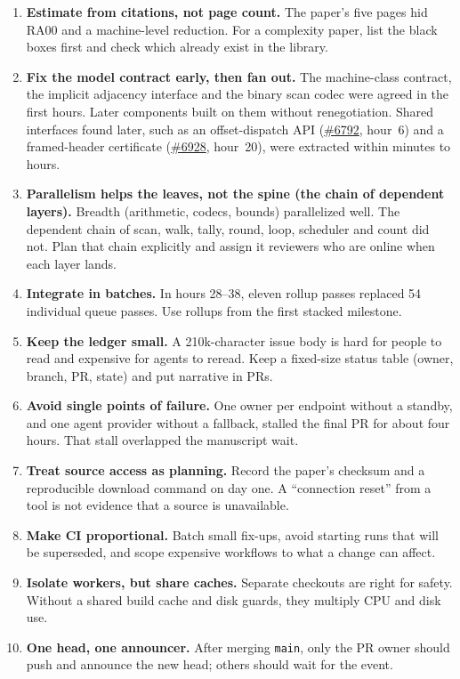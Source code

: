 \documentclass[11pt]{article}
\newcommand{\pr}[1]{\href{https://github.com/cslib-community/cslib-frontier/pull/#1}{\##1}}
\newcommand{\code}[1]{\texttt{\small #1}}
\begin{document}
\begin{enumerate}
\item \textbf{Estimate from citations, not page count.} The paper's five pages hid RA00 and a
machine-level reduction. For a complexity paper, list the black boxes first and check which
already exist in the library.
\item \textbf{Fix the model contract early, then fan out.} The machine-class contract, the implicit
adjacency interface and the binary scan codec were agreed in the first hours. Later components
built on them without renegotiation. Shared interfaces found later, such as an offset-dispatch
API (\pr{6792}, hour~6) and a framed-header certificate (\pr{6928}, hour~20), were extracted
within minutes to hours.
\item \textbf{Parallelism helps the leaves, not the spine (the chain of dependent layers).} Breadth (arithmetic, codecs, bounds)
parallelized well. The dependent chain of scan, walk, tally, round, loop, scheduler and count did
not. Plan that chain explicitly and assign it reviewers who are online when each layer lands.
\item \textbf{Integrate in batches.} In hours 28--38, eleven rollup passes replaced 54
individual queue passes. Use rollups from the first stacked milestone.
\item \textbf{Keep the ledger small.} A 210k-character issue body is hard for people to read and
expensive for agents to reread. Keep a fixed-size status table (owner, branch, PR, state) and put
narrative in PRs.
\item \textbf{Avoid single points of failure.} One owner per endpoint without a standby, and one
agent provider without a fallback, stalled the final PR for about four hours. That stall
overlapped the manuscript wait.
\item \textbf{Treat source access as planning.} Record the paper's checksum and a reproducible
download command on day one. A ``connection reset'' from a tool is not evidence that a source is
unavailable.
\item \textbf{Make CI proportional.} Batch small fix-ups, avoid starting runs that will be
superseded, and scope expensive workflows to what a change can affect.
\item \textbf{Isolate workers, but share caches.} Separate checkouts are right for safety. Without
a shared build cache and disk guards, they multiply CPU and disk use.
\item \textbf{One head, one announcer.} After merging \code{main}, only the PR owner should push
and announce the new head; others should wait for the event.
\end{enumerate}
\end{document}
